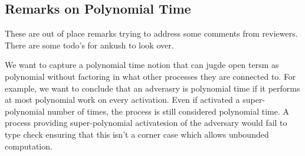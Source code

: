 \subsection{Remarks on Polynomial Time}
These are out of place remarks trying to address some comments from reviewers. There are some todo's for ankush to look over.



We want to capture a polynomial time notion that can jugde open tersm as polynomial without factoring in what other processes they are connected to. 
For example, we want to conclude that an adverasry is polynomial time if it performs at most polynomial work on every activation.
Even if activated a super-polynomial number of times, the process is still considered polynomial time.
A process providing super-polynomial activatesion of the adversary would fail to type check ensuring that this isn't a corner case which allows unbounded computation.



